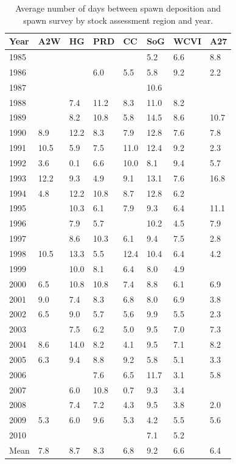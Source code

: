 \begin{table}[htdp]
\caption{Average number of days between spawn deposition and spawn survey by stock assessment region and year.}
\begin{center}
\begin{tabular}{llllllll}
\hline
Year&A2W&HG&PRD&CC&SoG&WCVI&A27\\
\hline
1985&& & & &5.2&6.6&8.8\\
1986& & &6.0&5.5&5.8&9.2&2.2\\
1987& & & & &10.6& & \\
1988& &7.4&11.2&8.3&11.0&8.2& \\
1989& &8.2&10.8&5.8&14.5&8.6&10.7\\
1990&8.9&12.2&8.3&7.9&12.8&7.6&7.8\\
1991&10.5&5.9&7.5&11.0&12.4&9.2&2.3\\
1992&3.6&0.1&6.6&10.0&8.1&9.4&5.7\\
1993&12.2&9.3&4.9&9.1&13.1&7.6&16.8\\
1994&4.8&12.2&10.8&8.7&12.8&6.2& \\
1995& &10.3&6.1&7.9&9.3&6.4&11.1\\
1996& &7.9&5.7& &10.2&4.5&7.9\\
1997& &8.6&10.3&6.1&9.4&7.5&2.8\\
1998&10.5&13.3&5.5&12.4&10.4&6.4&4.2\\
1999& &10.0&8.1&6.4&8.0&4.9& \\
2000&6.5&10.8&10.8&7.4&8.8&6.1&6.9\\
2001&9.0&7.4&8.3&6.8&8.0&6.9&3.8\\
2002&6.5&9.0&5.7&5.6&9.9&5.5&2.3\\
2003& &7.5&6.2&5.0&9.5&7.0&7.3\\
2004&8.6&14.0&8.2&4.1&9.5&7.1&8.2\\
2005&6.3&9.4&8.8&9.2&5.8&5.1&3.3\\
2006& & &7.6&6.5&11.7&3.1&5.8\\
2007& &6.0&10.8&0.7&9.3&3.4& \\
2008& &7.4&7.2&4.3&9.5&3.8&2.0\\
2009&5.3&6.0&9.6&5.3&4.2&5.5&5.6\\
2010& & & & &7.1&5.2& \\
\hline
Mean&7.8&8.7&8.3&6.8&9.2&6.6&6.4\\
\hline
\end{tabular}
\end{center}
\label{AppendixC:Table6}
\end{table}%

\clearpage

